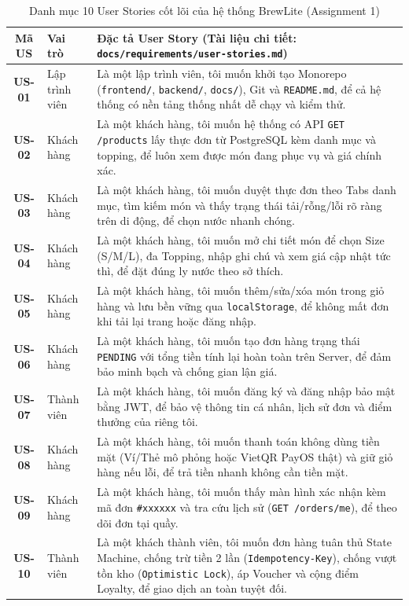 \documentclass[a4paper,12pt]{article}
\begin{document}
\begin{table}[h!]
\centering
\scriptsize
\begin{tabularx}{\textwidth}{|c|l|X|}
\hline
\textbf{Mã US} & \textbf{Vai trò} & \textbf{Đặc tả User Story (Tài liệu chi tiết: \texttt{docs/requirements/user-stories.md})} \\
\hline
\textbf{US-01} & Lập trình viên & Là một lập trình viên, tôi muốn khởi tạo Monorepo (\texttt{frontend/}, \texttt{backend/}, \texttt{docs/}), Git và \texttt{README.md}, để cả hệ thống có nền tảng thống nhất dễ chạy và kiểm thử. \\
\hline
\textbf{US-02} & Khách hàng & Là một khách hàng, tôi muốn hệ thống có API \texttt{GET /products} lấy thực đơn từ PostgreSQL kèm danh mục và topping, để luôn xem được món đang phục vụ và giá chính xác. \\
\hline
\textbf{US-03} & Khách hàng & Là một khách hàng, tôi muốn duyệt thực đơn theo Tabs danh mục, tìm kiếm món và thấy trạng thái tải/rỗng/lỗi rõ ràng trên di động, để chọn nước nhanh chóng. \\
\hline
\textbf{US-04} & Khách hàng & Là một khách hàng, tôi muốn mở chi tiết món để chọn Size (S/M/L), đa Topping, nhập ghi chú và xem giá cập nhật tức thì, để đặt đúng ly nước theo sở thích. \\
\hline
\textbf{US-05} & Khách hàng & Là một khách hàng, tôi muốn thêm/sửa/xóa món trong giỏ hàng và lưu bền vững qua \texttt{localStorage}, để không mất đơn khi tải lại trang hoặc đăng nhập. \\
\hline
\textbf{US-06} & Khách hàng & Là một khách hàng, tôi muốn tạo đơn hàng trạng thái \texttt{PENDING} với tổng tiền tính lại hoàn toàn trên Server, để đảm bảo minh bạch và chống gian lận giá. \\
\hline
\textbf{US-07} & Thành viên & Là một khách hàng, tôi muốn đăng ký và đăng nhập bảo mật bằng JWT, để bảo vệ thông tin cá nhân, lịch sử đơn và điểm thưởng của riêng tôi. \\
\hline
\textbf{US-08} & Khách hàng & Là một khách hàng, tôi muốn thanh toán không dùng tiền mặt (Ví/Thẻ mô phỏng hoặc VietQR PayOS thật) và giữ giỏ hàng nếu lỗi, để trả tiền nhanh không cần tiền mặt. \\
\hline
\textbf{US-09} & Khách hàng & Là một khách hàng, tôi muốn thấy màn hình xác nhận kèm mã đơn \texttt{\#xxxxxx} và tra cứu lịch sử (\texttt{GET /orders/me}), để theo dõi đơn tại quầy. \\
\hline
\textbf{US-10} & Thành viên & Là một khách thành viên, tôi muốn đơn hàng tuân thủ State Machine, chống trừ tiền 2 lần (\texttt{Idempotency-Key}), chống vượt tồn kho (\texttt{Optimistic Lock}), áp Voucher và cộng điểm Loyalty, để giao dịch an toàn tuyệt đối. \\
\hline
\end{tabularx}
\caption{Danh mục 10 User Stories cốt lõi của hệ thống BrewLite (Assignment 1)}
\end{table}
\end{document}
